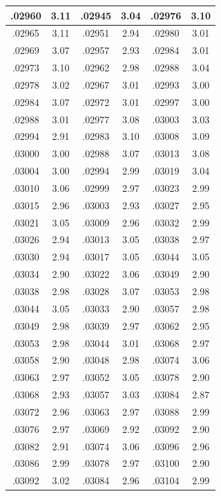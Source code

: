 \documentclass[10pt,twoside]{report}
\begin{document}
\begin{appendices}
\begin{longtable}{|c|c||c|c||c|c|}
.02960 & 3.11 & .02945 & 3.04 & .02976 & 3.10\\\hline
.02965 & 3.11 & .02951 & 2.94 & .02980 & 3.01\\\hline
.02969 & 3.07 & .02957 & 2.93 & .02984 & 3.01\\\hline
.02973 & 3.10 & .02962 & 2.98 & .02988 & 3.04\\\hline
.02978 & 3.02 & .02967 & 3.01 & .02993 & 3.00\\\hline
.02984 & 3.07 & .02972 & 3.01 & .02997 & 3.00\\\hline
.02988 & 3.01 & .02977 & 3.08 & .03003 & 3.03\\\hline
.02994 & 2.91 & .02983 & 3.10 & .03008 & 3.09\\\hline
.03000 & 3.00 & .02988 & 3.07 & .03013 & 3.08\\\hline
.03004 & 3.00 & .02994 & 2.99 & .03019 & 3.04\\\hline
.03010 & 3.06 & .02999 & 2.97 & .03023 & 2.99\\\hline
.03015 & 2.96 & .03003 & 2.93 & .03027 & 2.95\\\hline
.03021 & 3.05 & .03009 & 2.96 & .03032 & 2.99\\\hline
.03026 & 2.94 & .03013 & 3.05 & .03038 & 2.97\\\hline
.03030 & 2.94 & .03017 & 3.05 & .03044 & 3.05\\\hline
.03034 & 2.90 & .03022 & 3.06 & .03049 & 2.90\\\hline
.03038 & 2.98 & .03028 & 3.07 & .03053 & 2.98\\\hline
.03044 & 3.05 & .03033 & 2.90 & .03057 & 2.98\\\hline
.03049 & 2.98 & .03039 & 2.97 & .03062 & 2.95\\\hline
.03053 & 2.98 & .03044 & 3.01 & .03068 & 2.97\\\hline
.03058 & 2.90 & .03048 & 2.98 & .03074 & 3.06\\\hline
.03063 & 2.97 & .03052 & 3.05 & .03078 & 2.90\\\hline
.03068 & 2.93 & .03057 & 3.03 & .03084 & 2.87\\\hline
.03072 & 2.96 & .03063 & 2.97 & .03088 & 2.99\\\hline
.03076 & 2.97 & .03069 & 2.92 & .03092 & 2.90\\\hline
.03082 & 2.91 & .03074 & 3.06 & .03096 & 2.96\\\hline
.03086 & 2.99 & .03078 & 2.97 & .03100 & 2.90\\\hline
.03092 & 3.02 & .03084 & 2.96 & .03104 & 2.99\\\hline

\end{longtable}
\end{appendices}
\end{document}
